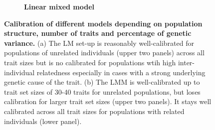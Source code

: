 \begin{figure}[!h]
\begin{subfigure}[b]{0.45\textwidth}
	\caption{\textbf{Linear mixed model}}
 		\label{fig:calibration-lmm}
	\end{subfigure}
	\caption{\textbf{Calibration of different models depending on population structure, number of traits and percentage of genetic variance.} (a) The LM set-up is reasonably well-calibrated for populations of unrelated individuals (upper two panels) across all trait sizes but is no calibrated for populations wtih high inter-individual relatedness especially in cases with a strong underlying genetic cause of the trait. (b) The LMM is well-calibrated up to trait set sizes of 30-40 traits for unrelated populations, but loses calibration for larger trait set sizes (upper two panels). It stays well calibrated across all trait sizes for populations with related individuals (lower panel).}
 	\label{fig:modelchoice}
\end{figure}

